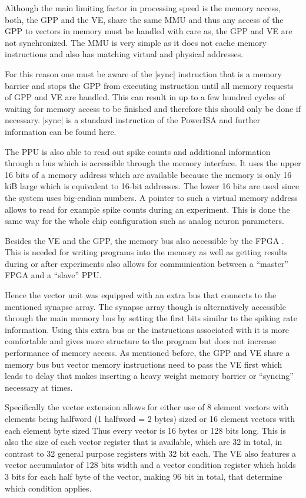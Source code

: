 Although the main limiting factor in processing speed is the memory access, both, the GPP and the VE, share the same MMU and thus any access of the GPP to vectors in memory must be handled with care as, the GPP and VE are not synchronized.
The MMU is very simple as it does not cache memory instructions and also has matching virtual and physical addresses.

For this reason one must be aware of the |sync| instruction that is a memory barrier and stops the GPP from executing instruction until all memory requests of GPP and VE are handled.
This can result in up to a few hundred cycles of waiting for memory access to be finished and therefore this should only be done if necessary.
|sync| is a standard instruction of the PowerISA and further information can be found here. 

The PPU is also able to read out spike counts and additional information through a bus which is accessible through the memory interface.
It uses the upper 16 bits of a memory address which are available because the memory is only 16 kiB large which is equivalent to 16-bit addresses.
The lower 16 bits are used since the system uses big-endian numbers.
A pointer to such a virtual memory address allows to read for example spike counts during an experiment.
This is done the same way for the whole chip configuration such as analog neuron parameters.

Besides the VE and the GPP, the memory bus also accessible by the FPGA .
This is needed for writing programs into the memory as well as getting results during or after experiments also allows for communication between a ``master'' FPGA and a ``slave'' PPU.

Hence the vector unit was equipped with an extra bus that connects to the mentioned synapse array.
The synapse array though is alternatively accessible through the main memory bus by setting the first bits similar to the spiking rate information.
Using this extra bus or the instructions associated with it is more comfortable and gives more structure to the program but does not increase performance of memory access.
As mentioned before, the GPP and VE share a memory bus but vector memory instructions need to pass the VE first which leads to delay that makes inserting a heavy weight memory barrier or ``syncing'' necessary at times.

Specifically the vector extension allows for either use of 8 element vectors with elements being halfword (1 halfword = 2 bytes) sized or 16 element vectors with each element byte sized
Thus every vector is 16 bytes or 128 bits long.
This is also the size of each vector register that is available, which are 32 in total, in contrast to 32 general purpose registers with 32 bit each.
The VE also features a vector accumulator of 128 bits width and a vector condition register which holds 3 bits for each half byte of the vector, making 96 bit in total, that determine which condition applies.


